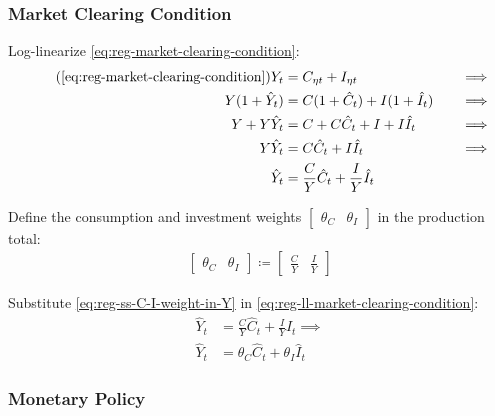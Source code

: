 \documentclass[
	thesis.tex
	]{subfiles}
\begin{document}

\subsubsection{Market Clearing Condition}

Log-linearize \ref{eq:reg-market-clearing-condition}:
\begin{alignat}{2}
	\tag{\ref{eq:reg-market-clearing-condition}}
	Y_t &= C_{\eta t} + I_{\eta t} &\implies \\
	Y (1+ \hat{Y}_t) &= C(1+ \hat{C}_t) + I (1+ \hat{I}_t) \quad &\implies \nonumber \\
	Y + Y\hat{Y}_t &= C + C\hat{C}_t + I + I\hat{I}_t &\implies \nonumber  \\
	Y\hat{Y}_t &= C\hat{C}_t + I\hat{I}_t &\implies \nonumber \\
	\hat{Y}_t &= \frac{C}{Y}\hat{C}_t + \frac{I}{Y}\hat{I}_t  \label{eq:reg-ll-market-clearing-condition}
\end{alignat}

Define the consumption and investment weights $\left[ \begin{smallmatrix} \theta_C & \theta_I \end{smallmatrix} \right] $ in the production total:
\begin{align}
	\label{eq:reg-ss-C-I-weight-in-Y}
	\begin{bmatrix}
		\theta_C & \theta_I
	\end{bmatrix} \coloneq 
	\begin{bmatrix}
		\displaystyle \frac{C}{Y} & \displaystyle \frac{I}{Y}
	\end{bmatrix}
\end{align}

Substitute \ref{eq:reg-ss-C-I-weight-in-Y} in \ref{eq:reg-ll-market-clearing-condition}:
\begin{align}
	\hat{Y}_t &= \frac{C}{Y}\hat{C}_t + \frac{I}{Y}\hat{I}_t \implies \nonumber \\
	\hat{Y}_t &= \theta_C \hat{C}_t + \theta_I \hat{I}_t 
	\label{eq:reg-ll-market-clearing-condition-theta}
\end{align}




\subsubsection{Monetary Policy}
\end{document}
